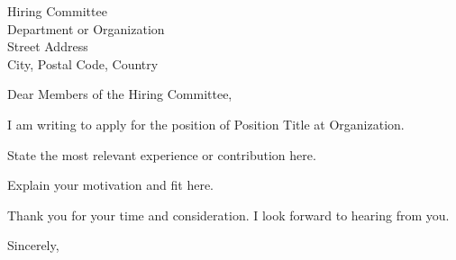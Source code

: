 \documentclass[11pt]{letter}
\date{Month DD, YYYY}
\begin{document}
\begin{letter}{Hiring Committee \\
  Department or Organization \\
  Street Address \\
  City, Postal Code, Country}

\opening{Dear Members of the Hiring Committee,}

I am writing to apply for the position of Position Title at Organization.

State the most relevant experience or contribution here.

Explain your motivation and fit here.

Thank you for your time and consideration. I look forward to hearing from you.

\closing{Sincerely,}


\end{letter}
\end{document}
